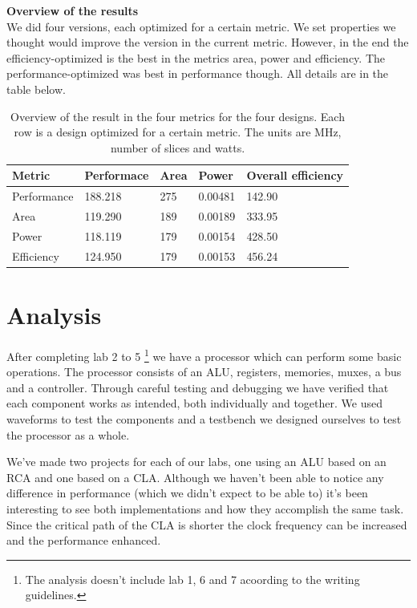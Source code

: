 \documentclass[a4paper,11pt]{article}
\begin{document}
\textbf{Overview of the results}\\
We did four versions, each optimized for a certain metric. We set properties we thought would improve the version in the current metric. However, in the end the efficiency-optimized is the best in the metrics area, power and efficiency. The performance-optimized was best in performance though. All details are in the table below.

\begin{table}[h!]
  \centering
  \begin{tabular}{|l||l|l|l|l|} \hline
  \textbf{Metric} & \textbf{Performace} & \textbf{Area} & \textbf{Power} & \textbf{Overall efficiency}  \\ \hline
  Performance & 188.218 & 275 & 0.00481 & 142.90 \\
  Area & 119.290 & 189 & 0.00189 & 333.95 \\
  Power & 118.119 & 179 & 0.00154 & 428.50 \\
  Efficiency & 124.950 & 179 & 0.00153 & 456.24\\ \hline
  \end{tabular}
  \caption{Overview of the result in the four metrics for the four designs. Each row is a design optimized for a certain metric. The units are MHz, number of slices and watts.}
\end{table}

\newpage
\section{Analysis}

After completing lab 2 to 5 \footnote{The analysis doesn't include lab 1, 6 and 7 acoording to the writing guidelines.} we have a processor which can perform some basic operations. The processor consists of an ALU, registers, memories, muxes, a bus and a controller. Through careful testing and debugging we have verified that each component works as intended, both individually and together. We used waveforms to test the components and a testbench we designed ourselves to test the processor as a whole.

We've made two projects for each of our labs, one using an ALU based on an RCA and one based on a CLA. Although we haven't been able to notice any difference in performance (which we didn't expect to be able to) it's been interesting to see both implementations and how they accomplish the same task. Since the critical path of the CLA is shorter the clock frequency can be increased and the performance enhanced.
 
\end{document}
